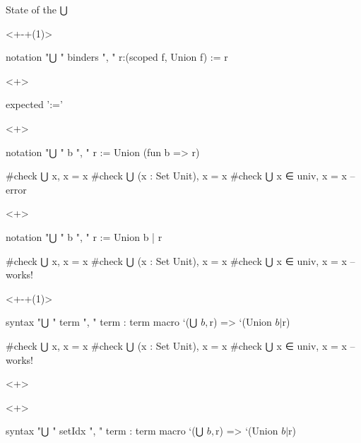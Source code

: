 \documentclass[t]{beamer}
\begin{document}
\begin{frame}[fragile]{State of the ⋃}
  \begin{onlyenv}<+-+(1)>
\begin{leancode}
notation "⋃ " binders ", " r:(scoped f, Union f) := r
\end{leancode}
    \vspace{-5mm}
    \begin{onlyenv}<+>
\begin{leancode}
expected ':='
\end{leancode}
    \end{onlyenv}
  \end{onlyenv}
  \begin{onlyenv}<+>
\begin{leancode}
notation "⋃ " b ", " r := Union (fun b => r)


#check ⋃ x,              x = x
#check ⋃ (x : Set Unit), x = x
#check ⋃ x ∈ univ,       x = x   -- error
\end{leancode}
  \end{onlyenv}
  \begin{onlyenv}<+>
\begin{leancode}
notation "⋃ " b ", " r := Union {b | r}


#check ⋃ x,              x = x
#check ⋃ (x : Set Unit), x = x
#check ⋃ x ∈ univ,       x = x   -- works!
\end{leancode}
  \end{onlyenv}
  \begin{onlyenv}<+-+(1)>
\begin{leancode}
syntax "⋃ " term ", " term : term
macro `(⋃ $b, $r) => `(Union {$b | $r})

#check ⋃ x,              x = x
#check ⋃ (x : Set Unit), x = x
#check ⋃ x ∈ univ,       x = x   -- works!
\end{leancode}
    \vspace{-5mm}
    \begin{onlyenv}<+>
    \end{onlyenv}
  \end{onlyenv}
  \begin{onlyenv}<+>
\begin{leancode}
syntax "⋃ " setIdx ", " term : term
macro `(⋃ $b, $r) => `(Union {$b | $r})


\end{leancode}
\end{onlyenv}
\end{frame}
\end{document}
